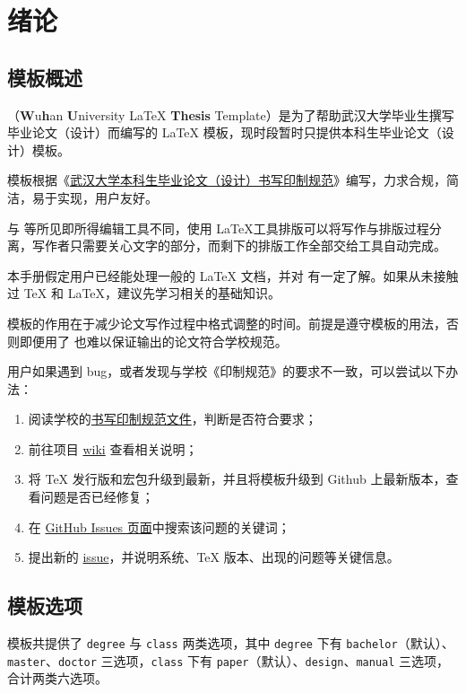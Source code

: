 
\chapter{绪论}
\section{模板概述}
\WhuThesis（\textbf{W}u\textbf{h}an \textbf{U}niversity \LaTeX{} \textbf{Thesis} Template）是为了帮助武汉大学毕业生撰写毕业论文（设计）而编写的 \LaTeX{} 模板，现时段暂时只提供本科生毕业论文（设计）模板。

模板根据《\href{https://github.com/mtobeiyf/whu-thesis/files/4638713/default.pdf}{武汉大学本科生毕业论文（设计）书写印制规范}》编写，力求合规，简洁，易于实现，用户友好。

与  等所见即所得编辑工具不同，使用 \LaTeX 工具排版可以将写作与排版过程分离，写作者只需要关心文字的部分，而剩下的排版工作全部交给工具自动完成。

本手册假定用户已经能处理一般的 \LaTeX{} 文档，并对 有一定了解。如果从未接触过 \TeX{} 和 \LaTeX{}，建议先学习相关的基础知识。

\begin{notice}
    模板的作用在于减少论文写作过程中格式调整的时间。前提是遵守模板的用法，否则即便用了 \WhuThesis 也难以保证输出的论文符合学校规范。
\end{notice}

用户如果遇到 bug，或者发现与学校《印制规范》的要求不一致，可以尝试以下办法：
\begin{enumerate}
    \item 阅读学校的\href{https://github.com/mtobeiyf/whu-thesis/files/4638713/default.pdf}{书写印制规范文件}，判断是否符合要求；
    \item 前往项目 \href{https://github.com/mtobeiyf/whu-thesis/wiki}{wiki} 查看相关说明；
    \item 将 \TeX{} 发行版和宏包升级到最新，并且将模板升级到 Github 上最新版本，查看问题是否已经修复；
    \item 在 \href{https://github.com/mtobeiyf/whu-thesis/issues}{GitHub Issues 页面}中搜索该问题的关键词；
    \item 提出新的 \href{https://github.com/mtobeiyf/whu-thesis/issues}{issue}，并说明系统、\TeX{} 版本、出现的问题等关键信息。
\end{enumerate}

\section{模板选项}
模板共提供了 \verb|degree| 与 \verb|class| 两类选项，其中 \verb|degree| 下有 \verb|bachelor|（默认）、\verb|master|、\verb|doctor| 三选项，\verb|class| 下有 \verb|paper|（默认）、\verb|design|、\verb|manual| 三选项，合计两类六选项。

